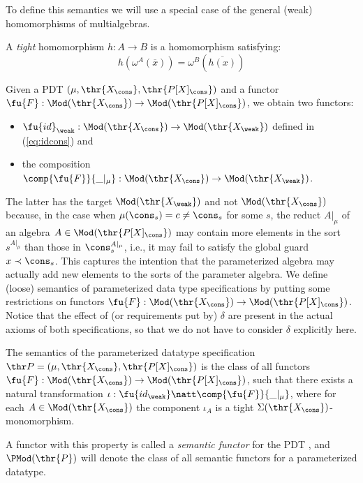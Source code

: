 To define this semantics we will use a special case of the general (weak)
homomorphisms of multialgebras.
\begin{definition}
A {\em tight} homomorphism $h:A \to B$ is a homomorphism satisfying:
	\[ h(\omega^A(\overline{x})) = \omega^B(\overline{h(x)}) \]
\end{definition}
Given a PDT $(\mu,\thr{X_\cons},\thr{P[X]_\cons})$
and a functor $\fu{F}:\Mod(\thr{X_\cons})\to \Mod(\thr{P[X]_\cons})$, we
obtain two functors: 
\begin{itemize}\MyLPar
\item 
$\fu{id}_\weak:\Mod(\thr{X_\cons})\to \Mod(\thr{X_\weak})$ defined in
 (\ref{eq:idcons}) and
\item  the composition
$\comp{\fu{F}}{\_|_\mu}:\Mod(\thr{X_\cons})\to \Mod(\thr{X_\weak})$. 
\end{itemize}
The latter has the target $\Mod(\thr{X_\weak})$ and not $\Mod(\thr{X_\cons})$
because, in the case when $\mu(\cons_s)=c\not=\cons_s$ for some $s$, the
reduct $A|_\mu$ of an algebra $A\in\Mod(\thr{P[X]_\cons})$ may contain more
elements in the sort $s^{A|_{\mu}}$ than those in $\cons_s^{A|_{\mu}}$, i.e.,
it may fail to satisfy the global guard $x\prec \cons_s$. This captures the
intention that the parameterized algebra may actually add new elements to the
sorts of the parameter algebra. We define (loose) semantics of parameterized
data type specifications by putting some restrictions on functors
$\fu{F}:\Mod(\thr{X_\cons})\to \Mod(\thr{P[X]_\cons})$. Notice that the
effect of (or requirements put by) $\delta$ are present in the actual axioms
of both specifications, so that we do not have to consider $\delta$ explicitly
here. 
%
\begin{definition}
\label{def:parametersemantic}
The semantics of the
parameterized datatype specification $\thr P = (\mu,\thr{X_\cons},\thr{P[X]_\cons})$
is the class of all functors $\fu{F}:
\Mod(\thr{X_\cons}) \to \Mod(\thr{P[X]_\cons})$, such that there exists a
natural transformation $\iota: \fu{id_\weak} \natt
\comp{\fu{F}}{\_|_{\mu}}$, where for each $A\in\Mod(\thr{X_\cons})$ the
component $\iota_A$ is a tight ${\Sigma}(\thr{X_\cons})$-monomorphism.
\end{definition}
A functor with this property is
called a {\em semantic functor} for the PDT ,
 and $\PMod(\thr{P})$ will denote the class of all semantic functors for a parameterized
datatype.

